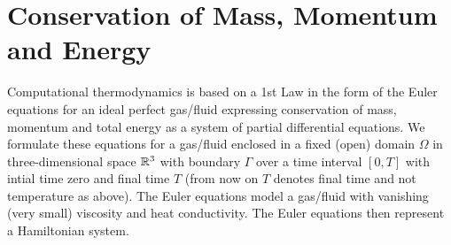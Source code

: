 \section{Conservation of Mass, Momentum and Energy}

Computational thermodynamics is based on a 1st Law
in the form of the 
Euler equations for an ideal perfect gas/fluid
expressing conservation of mass,
momentum and total energy as a system of partial differential equations.
We formulate these equations for a 
gas/fluid enclosed in a fixed
(open) domain $\Omega$ in three-dimensional space  
${\mathbb{R}}^3$ with
boundary $\Gamma$ over a time interval $[0,T]$
with intial time zero and final time $T$ (from now on $T$ denotes
final time and not temperature
as above). 
The Euler equations model a gas/fluid with 
vanishing (very small) viscosity and heat conductivity. 
The Euler equations then 
represent a Hamiltonian system. 

